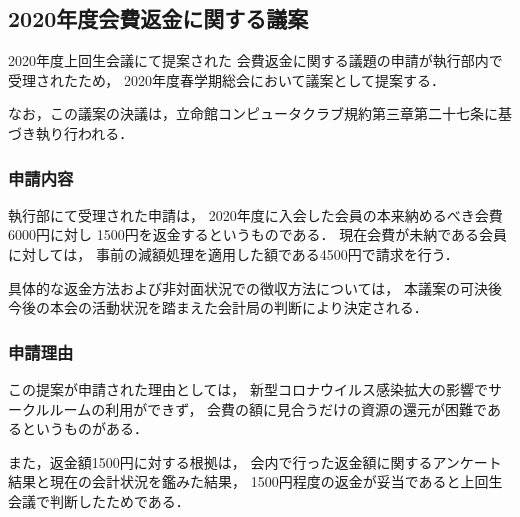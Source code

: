 \subsection*{2020年度会費返金に関する議案}

2020年度上回生会議にて提案された
会費返金に関する議題の申請が執行部内で受理されたため，
2020年度春学期総会において議案として提案する．

なお，この議案の決議は，立命館コンピュータクラブ規約第三章第二十七条に基づき執り行われる．

\subsubsection*{申請内容}
執行部にて受理された申請は，
2020年度に入会した会員の本来納めるべき会費6000円に対し
1500円を返金するというものである．
現在会費が未納である会員に対しては，
事前の減額処理を適用した額である4500円で請求を行う．

具体的な返金方法および非対面状況での徴収方法については，
本議案の可決後今後の本会の活動状況を踏まえた会計局の判断により決定される．


\subsubsection*{申請理由}
この提案が申請された理由としては，
新型コロナウイルス感染拡大の影響でサークルルームの利用ができず，
会費の額に見合うだけの資源の還元が困難であるというものがある．

また，返金額1500円に対する根拠は，
会内で行った返金額に関するアンケート結果と現在の会計状況を鑑みた結果，
1500円程度の返金が妥当であると上回生会議で判断したためである．


